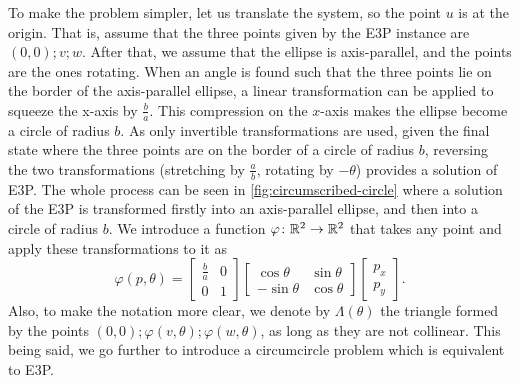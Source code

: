 To make the problem simpler, let us translate the system, so the point $u$ is at the origin. That is, assume that the three points given by the E3P instance are $(0, 0); v; w$. After that, we assume that the ellipse is axis-parallel, and the points are the ones rotating. When an angle is found such that the three points lie on the border of the axis-parallel ellipse, a linear transformation can be applied to squeeze the x-axis by $\frac{b}{a}$. This compression on the $x$-axis makes the ellipse become a circle of radius $b$. 
As only invertible transformations are used, given the final state where the three points are on the border of a circle of radius $b$, reversing the two transformations (stretching by $\frac{a}{b}$, rotating by $-\theta$) provides a solution of E3P.
The whole process can be seen in \autoref{fig:circumscribed-circle} where a solution of the E3P is transformed firstly into an axis-parallel ellipse, and then into a circle of radius $b$. We introduce a function $\varphi\colon \mathbb{R}^2 \to \mathbb{R}^2$ that takes any point and apply these transformations to it as
\begin{equation}\label{eq:trpnts}
\varphi(p, \theta)=\left[\begin{array}{cc}
\frac{b}{a}&0\\
0&1
\end{array}\right]
\left[\begin{array}{cc}
\cos{\theta}&\sin{\theta}\\
-\sin{\theta}&\cos{\theta}
\end{array}\right]\left[\begin{array}{c}
p_x\\
p_y
\end{array}\right].
\end{equation}
Also, to make the notation more clear, we denote by $\Lambda(\theta)$ the triangle formed by the points $(0, 0); \varphi(v, \theta); \varphi(w, \theta)$, as long as they are not collinear. This being said, we go further to introduce a circumcircle problem which is equivalent to E3P.

